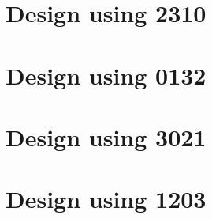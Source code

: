 \section{Design using 2310}


 \begin{center}




 \end{center}



\section{Design using 0132}


 \begin{center}




 \end{center}



\section{Design using 3021}


 \begin{center}




 \end{center}



\section{Design using 1203}


 \begin{center}




 \end{center}



